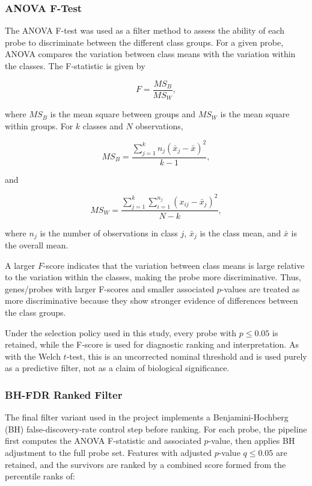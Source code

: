 \subsubsection{ANOVA F-Test}

The ANOVA F-test was used as a filter method to assess the ability of each probe to discriminate between the different class groups. For a given probe, ANOVA compares the variation between class means with the variation within the classes. The F-statistic is given by

$$
F = \frac{MS_B}{MS_W},
$$

where \(MS_B\) is the mean square between groups and \(MS_W\) is the mean square within groups. For \(k\) classes and \(N\) observations,

$$
MS_B = \frac{\displaystyle\sum_{j=1}^{k} n_j(\bar{x}_j-\bar{x})^2}{k-1},
$$

and

$$
MS_W = \frac{\displaystyle\sum_{j=1}^{k}\sum_{i=1}^{n_j}(x_{ij}-\bar{x}_j)^2}{N-k},
$$

where \(n_j\) is the number of observations in class \(j\), \(\bar{x}_j\) is the class mean, and \(\bar{x}\) is the overall mean.

A larger \(F\)-score indicates that the variation between class means is large relative to the variation within the classes, making the probe more discriminative. Thus, genes/probes with larger F-scores and smaller associated \(p\)-values are treated as more discriminative because they show stronger evidence of differences between the class groups.

Under the selection policy used in this study, every probe with \(p \leq 0.05\) is retained, while the F-score is used for diagnostic ranking and interpretation. As with the Welch \(t\)-test, this is an uncorrected nominal threshold and is used purely as a predictive filter, not as a claim of biological significance.


\subsubsection{BH-FDR Ranked Filter}

The final filter variant used in the project implements a Benjamini-Hochberg (BH) false-discovery-rate control step before ranking. For each probe, the pipeline first computes the ANOVA F-statistic and associated $p$-value, then applies BH adjustment to the full probe set. Features with adjusted $p$-value $q \leq 0.05$ are retained, and the survivors are ranked by a combined score formed from the percentile ranks of:

